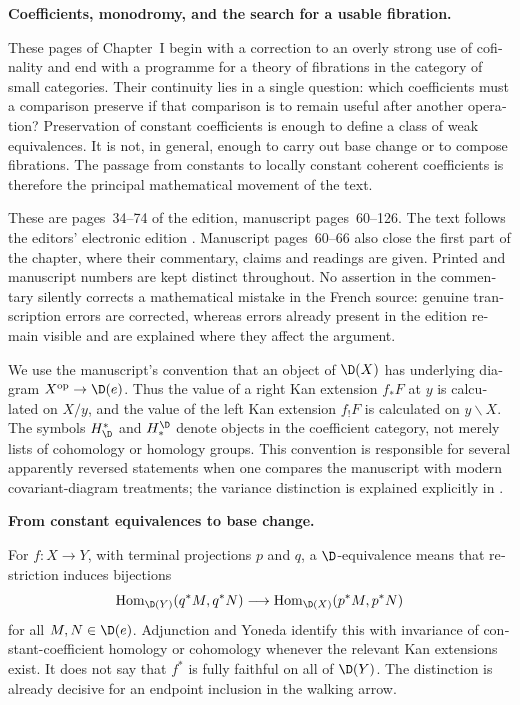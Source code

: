 \begin{otherlanguage}{english}
\noindent\textbf{Coefficients, monodromy, and the search for a usable fibration.}

These pages of Chapter~I begin with a correction to an overly strong use of cofinality and end with a programme for a theory of fibrations in the category of small categories. Their continuity lies in a single question: which coefficients must a comparison preserve if that comparison is to remain useful after another operation? Preservation of constant coefficients is enough to define a class of weak equivalences. It is not, in general, enough to carry out base change or to compose fibrations. The passage from constants to locally constant coherent coefficients is therefore the principal mathematical movement of the text.

These are pages~34--74 of the edition, manuscript pages~60--126. The text follows the editors' electronic edition \citep{Grothendieck1990Derivateurs}. Manuscript pages~60--66 also close the first part of the chapter, where their commentary, claims and readings are given. Printed and manuscript numbers are kept distinct throughout. No assertion in the commentary silently corrects a mathematical mistake in the French source: genuine transcription errors are corrected, whereas errors already present in the edition remain visible and are explained where they affect the argument.

We use the manuscript's convention that an object of $\D(X)$ has underlying diagram $X^{\mathrm{op}}\to\D(e)$. Thus the value of a right Kan extension $f_*F$ at $y$ is calculated on $X/y$, and the value of the left Kan extension $f_!F$ is calculated on $y\backslash X$. The symbols $H^*_{\D}$ and $H_*^{\D}$ denote objects in the coefficient category, not merely lists of cohomology or homology groups. This convention is responsible for several apparently reversed statements when one compares the manuscript with modern covariant-diagram treatments; the variance distinction is explained explicitly in \citet[Warning~2.2]{GrothPontoShulman2014}.

\medskip\noindent\textbf{From constant equivalences to base change.}

For $f:X\to Y$, with terminal projections $p$ and $q$, a $\D$-equivalence means that restriction induces bijections
\[
 \operatorname{Hom}_{\D(Y)}(q^*M,q^*N)
 \longrightarrow
 \operatorname{Hom}_{\D(X)}(p^*M,p^*N)
\]
for all $M,N\in\D(e)$. Adjunction and Yoneda identify this with invariance of constant-coefficient homology or cohomology whenever the relevant Kan extensions exist. It does not say that $f^*$ is fully faithful on all of $\D(Y)$. The distinction is already decisive for an endpoint inclusion in the walking arrow.


\end{otherlanguage}
